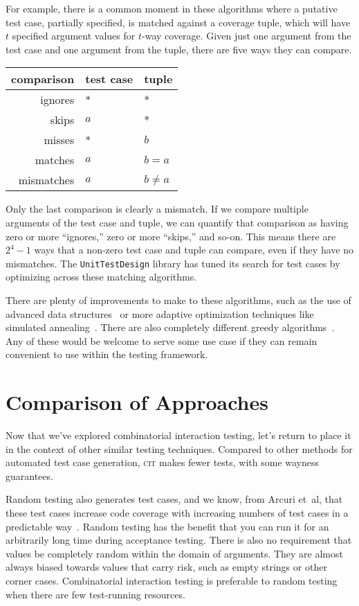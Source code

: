 \documentclass{juliacon}
\newcommand{\utd}{\texttt{UnitTestDesign}\xspace}
\newcommand{\cit}{\textsc{cit}\xspace}
\begin{document}
\vskip 6pt
For example, there is a common moment in these algorithms where a putative test case, partially specified, is matched against a coverage tuple, which will have $t$ specified argument values for $t$-way coverage. Given just one argument from the test case and one argument from the tuple, there are five ways they can compare.
\begin{center}
\begin{tabular}{rll}
comparison & test case & tuple \\ \hline
ignores & * & * \\
skips & $a$ & * \\
misses & * & $b$ \\
matches & $a$ & $b=a$ \\
mismatches & $a$ & $b\ne a$
\end{tabular}
\end{center}
Only the last comparison is clearly a mismatch. If we compare multiple arguments of the test case and tuple, we can quantify that comparison as having zero or more ``ignores,'' zero or more ``skips,'' and so-on. This means there are $2^4-1$ ways that a non-zero test case and tuple can compare, even if they have no mismatches. The \utd library has tuned its search for test cases by optimizing across these matching algorithms.

\vskip 6pt
There are plenty of improvements to make to these algorithms, such as the use of advanced data structures~\cite{Segall2011-jv} or more adaptive optimization techniques like simulated annealing~\cite{Petke2015-ex}. There are also completely different greedy algorithms~\cite{Calvagna2012-ic,Koc2018-vs}. Any of these would be welcome to serve some use case if they can remain convenient to use within the testing framework.


\section{Comparison of Approaches}\label{sec:comparison}

Now that we've explored combinatorial interaction testing, let's return to place it in the context of other similar testing techniques. Compared to other methods for automated test case generation, \cit makes fewer tests, with some wayness guarantees.

\vskip 6pt
Random testing also generates test cases, and we know, from Arcuri et~al, that these test cases increase code coverage with increasing numbers of test cases in a predictable way~\cite{Arcuri2012-az}. Random testing has the benefit that you can run it for an arbitrarily long time during acceptance testing. There is also no requirement that values be completely random within the domain of arguments. They are almost always biased towards values that carry risk, such as empty strings or other corner cases. Combinatorial interaction testing is preferable to random testing when there are few test-running resources.
\end{document}
